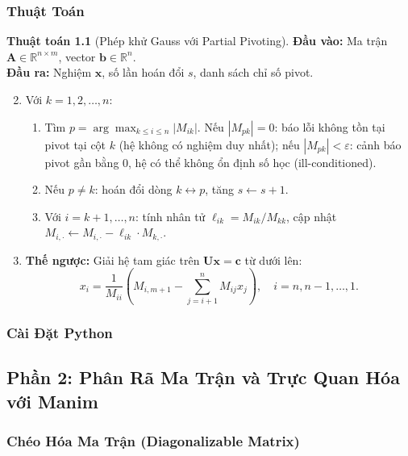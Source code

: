 \documentclass[12pt]{article}
\begin{document}
\subsubsection{Thuật Toán}

\textbf{Thuật toán 1.1} (Phép khử Gauss với Partial Pivoting). \textbf{Đầu vào:} Ma trận $\mathbf{A} \in \mathbb{R}^{n \times m}$, vector $\mathbf{b} \in \mathbb{R}^n$. \\
\textbf{Đầu ra:} Nghiệm $\mathbf{x}$, số lần hoán đổi $s$, danh sách chỉ số pivot.

\begin{enumerate}
    \setcounter{enumi}{1} %
    \item Với $k = 1, 2, \dots, n$:
    \begin{enumerate}[label=\alph*.]
        \item Tìm $p = \arg \max_{k \le i \le n} |M_{ik}|$. Nếu $|M_{pk}| = 0$: báo lỗi không tồn tại pivot tại cột $k$ (hệ không có nghiệm duy nhất); nếu $|M_{pk}| < \varepsilon$: cảnh báo pivot gần bằng 0, hệ có thể không ổn định số học (ill-conditioned).
        \item Nếu $p \neq k$: hoán đổi dòng $k \leftrightarrow p$, tăng $s \leftarrow s + 1$.
        \item Với $i = k + 1, \dots, n$: tính nhân tử $\ell_{ik} = M_{ik}/M_{kk}$, cập nhật $M_{i, \cdot} \leftarrow M_{i, \cdot} - \ell_{ik} \cdot M_{k, \cdot}$.
    \end{enumerate}

    \item \textbf{Thế ngược:} Giải hệ tam giác trên $\mathbf{Ux} = \mathbf{c}$ từ dưới lên:
    \begin{equation}
    x_i = \frac{1}{M_{ii}} \left( M_{i,m+1} - \sum_{j=i+1}^n M_{ij} x_j \right), \quad i = n, n-1, \dots, 1.
    \end{equation}
\end{enumerate}

\subsubsection{Cài Đặt Python}

\subsection{Phần 2: Phân Rã Ma Trận và Trực Quan Hóa với Manim}

\subsubsection{Chéo Hóa Ma Trận (Diagonalizable Matrix)}
\end{document}
